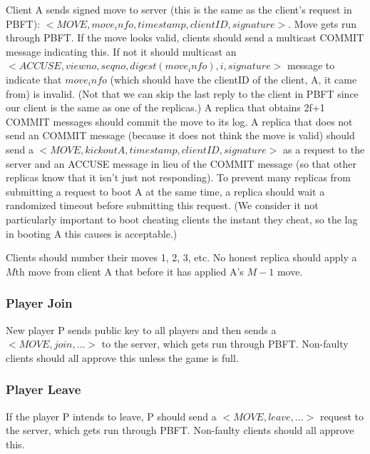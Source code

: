 \documentclass[12pt]{article}
\begin{document}
Client A sends signed move to server (this is the same as the client’s request in PBFT): $<MOVE, move_info, timestamp, clientID, signature>$. Move gets run through PBFT. If the move looks valid, clients should send a multicast COMMIT message indicating this. If not it should multicast an $<ACCUSE, viewno, seqno, digest(move_info), i, signature>$ message to indicate that $move_info$ (which should have the clientID of the client, A, it came from) is invalid. (Not that we can skip the last reply to the client in PBFT since our client is the same as one of the replicas.) A replica that obtains 2f+1 COMMIT messages should commit the move to its log. A replica that does not send an COMMIT message (because it does not think the move is valid) should send a $<MOVE, kick out A, timestamp, clientID, signature>$ as a request to the server and an ACCUSE message in lieu of the COMMIT message (so that other replicas know that it isn’t just not responding). To prevent many replicas from submitting a request to boot A at the same time, a replica should wait a randomized timeout before submitting this request. (We consider it not particularly important to boot cheating clients the instant they cheat, so the lag in booting A this causes is acceptable.) 

Clients should number their moves 1, 2, 3, etc. No honest replica should apply a $M$th move from client A that before it has applied A’s $M-1$ move. 

\subsubsection{Player Join}

New player P sends public key to all players and then sends a $<MOVE, join, ...>$ to the server, which gets run through PBFT. Non-faulty clients should all approve this unless the game is full.

\subsubsection{Player Leave}

If the player P intends to leave, P should send a $<MOVE, leave,...>$ request to the server, which gets run through PBFT. Non-faulty clients should all approve this.
\end{document}
